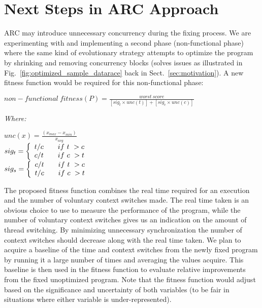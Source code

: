 \section{Next Steps in ARC Approach}
\label{sec:ongoing}

ARC may introduce unnecessary concurrency during the fixing process. We are
experimenting with and implementing a second phase (non-functional phase) where
the same kind of evolutionary strategy attempts to optimize the program by
shrinking and removing concurrency blocks (solves issues as illustrated in
Fig.~\ref{fig:optimized_sample_datarace} back in Sect.~\ref{sec:motivation}). A
new fitness function would be required for this non-functional phase:

\begin{footnotesize}
\begin{center}
$non-functional\ fitness(P) = \frac{worst\ score}{[sig_t \times unc(t)] + [sig_c \times unc(c)]}$
\end{center}
\vspace{0.1cm} \textit{Where:} \vspace{0.1cm}
\end{footnotesize}
\begin{scriptsize}
\begin{center}
$unc(x) = \frac{(x_{max} - x_{min})}{x_{avg}}$ \\ \vspace{0.2cm}
$
 sig_t = \left\{
 \begin{array}{l l}
   t/c & \quad if\ t\ > c \\
   c/t & \quad if\ c\ > t \\
 \end{array} \right.
$ \\ \vspace{0.2cm}
$
 sig_s = \left\{
 \begin{array}{l l}
   c/t & \quad if\ t\ > c \\
   t/c & \quad if\ c\ > t \\
 \end{array} \right.
$ \\
\end{center}
\end{scriptsize}


\noindent The proposed fitness function combines the real time required for an execution and the number of
voluntary context switches made. The real time taken is an obvious choice to
use to measure the performance of the program, while the number of voluntary
context switches gives us an indication on the amount of thread switching. By
minimizing unnecessary synchronization the number of context switches should
decrease along with the real time taken. We plan to acquire a baseline of the
time and context switches from the newly fixed program by running it a large
number of times and averaging the values acquire. This baseline is then used in
the fitness function to evaluate relative improvements from the fixed
unoptimized program. Note that the fitness function would adjust based on the
significance and uncertainty of both variables (to be fair in situations where
either variable is under-represented).

